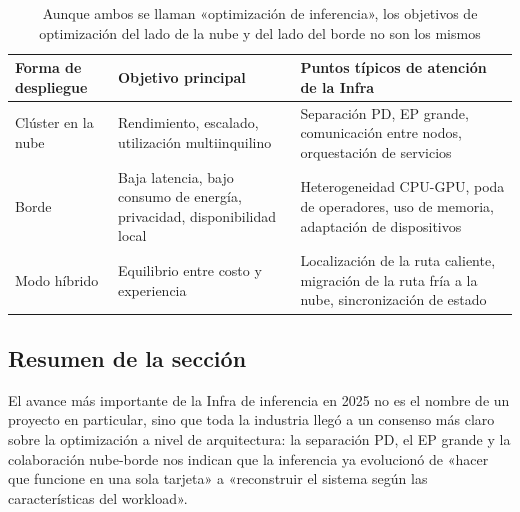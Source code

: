 \begin{table}[H]
\centering
\begin{tabular}{p{2.8cm}p{4.0cm}p{4.5cm}}
\toprule
\textbf{Forma de despliegue} & \textbf{Objetivo principal} & \textbf{Puntos típicos de atención de la Infra} \\
\midrule
Clúster en la nube & Rendimiento, escalado, utilización multiinquilino & Separación PD, EP grande, comunicación entre nodos, orquestación de servicios \\
Borde & Baja latencia, bajo consumo de energía, privacidad, disponibilidad local & Heterogeneidad CPU-GPU, poda de operadores, uso de memoria, adaptación de dispositivos \\
Modo híbrido & Equilibrio entre costo y experiencia & Localización de la ruta caliente, migración de la ruta fría a la nube, sincronización de estado \\
\bottomrule
\end{tabular}
\caption{Aunque ambos se llaman «optimización de inferencia», los objetivos de optimización del lado de la nube y del lado del borde no son los mismos}
\end{table}

\subsection{Resumen de la sección}
El avance más importante de la Infra de inferencia en 2025 no es el nombre de un proyecto en particular, sino que toda la industria llegó a un consenso más claro sobre la optimización a nivel de arquitectura: la separación PD, el EP grande y la colaboración nube-borde nos indican que la inferencia ya evolucionó de «hacer que funcione en una sola tarjeta» a «reconstruir el sistema según las características del workload».
